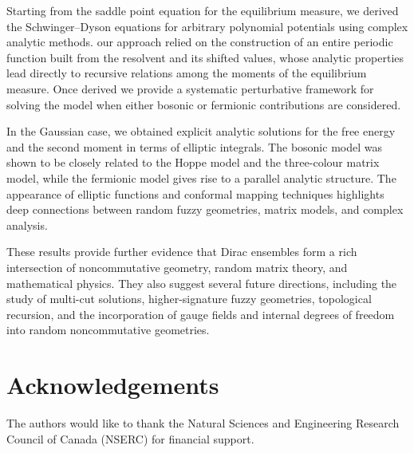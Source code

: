 \documentclass[10pt]{article}
\theoremstyle{plain}
\theoremstyle{definition}
\theoremstyle{plain}
\begin{document}
Starting from the saddle point equation for the equilibrium measure, we derived the Schwinger--Dyson equations for arbitrary polynomial potentials using complex analytic methods. our approach relied on the construction of an entire periodic function built from the resolvent and its shifted values, whose analytic properties lead directly to recursive relations among the moments of the equilibrium measure. Once derived we provide a systematic perturbative framework for solving the model when either bosonic or fermionic contributions are considered.

In the Gaussian case, we obtained explicit analytic solutions for the free energy and the second moment in terms of elliptic integrals. The bosonic model was shown to be closely related to the Hoppe model and the three-colour matrix model, while the fermionic model gives rise to a parallel analytic structure. The appearance of elliptic functions and conformal mapping techniques highlights deep connections between random fuzzy geometries, matrix models, and complex analysis.

These results provide further evidence that Dirac ensembles form a rich intersection of noncommutative geometry, random matrix theory, and mathematical physics. They also suggest several future directions, including the study of multi-cut solutions, higher-signature fuzzy geometries, topological recursion, and the incorporation of gauge fields and internal degrees of freedom into random noncommutative geometries.


\section*{Acknowledgements}
 The authors would like to thank the Natural Sciences and Engineering Research Council of Canada (NSERC) for financial support.


\printbibliography


\appendix
\end{document}
